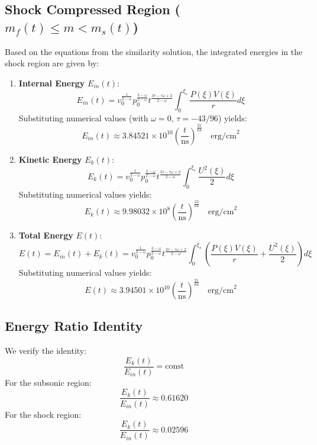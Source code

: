 \documentclass[11pt]{article}
\begin{document}
\subsection{Shock Compressed Region ($m_f(t) \le m < m_s(t)$)}
Based on the equations from the similarity solution, the integrated energies in the shock region are given by:
\begin{enumerate}
    \item \textbf{Internal Energy} $E_{in}(t)$:
    \begin{equation}
        E_{in}(t) = v_0^{\frac{1}{2-\omega}} p_0^{\frac{3-\omega}{2-\omega}} t^{\frac{3\tau - \tau\omega + 2}{2-\omega}} \int_0^{\xi_s} \frac{P(\xi)V(\xi)}{r} d\xi
    \end{equation}
    Substituting numerical values (with $\omega = 0$, $\tau = -43/96$) yields:
    \begin{equation}
        E_{in}(t) \approx 3.84521 \times 10^{10} \left(\frac{t}{\text{ns}}\right)^{\frac{21}{64}} \quad \text{erg/cm}^2
    \end{equation}

    \item \textbf{Kinetic Energy} $E_k(t)$:
    \begin{equation}
        E_k(t) = v_0^{\frac{1}{2-\omega}} p_0^{\frac{3-\omega}{2-\omega}} t^{\frac{3\tau - \tau\omega + 2}{2-\omega}} \int_0^{\xi_s} \frac{U^2(\xi)}{2} d\xi
    \end{equation}
    Substituting numerical values yields:
    \begin{equation}
        E_k(t) \approx 9.98032 \times 10^{8} \left(\frac{t}{\text{ns}}\right)^{\frac{21}{64}} \quad \text{erg/cm}^2
    \end{equation}

    \item \textbf{Total Energy} $E(t)$:
    \begin{equation}
        E(t) = E_{in}(t) + E_k(t) = v_0^{\frac{1}{2-\omega}} p_0^{\frac{3-\omega}{2-\omega}} t^{\frac{3\tau - \tau\omega + 2}{2-\omega}} \int_0^{\xi_s} \left(\frac{P(\xi)V(\xi)}{r} + \frac{U^2(\xi)}{2}\right) d\xi
    \end{equation}
    Substituting numerical values yields:
    \begin{equation}
        E(t) \approx 3.94501 \times 10^{10} \left(\frac{t}{\text{ns}}\right)^{\frac{21}{64}} \quad \text{erg/cm}^2
    \end{equation}
\end{enumerate}

\subsection{Energy Ratio Identity}
We verify the identity:
\begin{equation}
    \frac{E_k(t)}{E_{in}(t)} = \text{const}
\end{equation}
For the subsonic region:
\begin{equation}
    \frac{E_k(t)}{E_{in}(t)} \approx 0.61620
\end{equation}
For the shock region:
\begin{equation}
    \frac{E_k(t)}{E_{in}(t)} \approx 0.02596
\end{equation}
\end{document}

